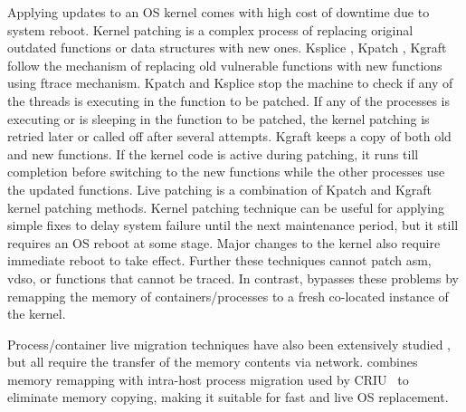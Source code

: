 
Applying updates to an OS kernel comes with high cost of downtime due to system reboot. 
Kernel patching is a complex process of replacing original outdated functions or 
data structures with new ones. Ksplice \cite{arnold2009ksplice}, Kpatch \cite{kpatch1, kpatch2}, 
Kgraft \cite{kgraft} follow the mechanism of replacing old vulnerable functions with 
new functions using ftrace mechanism. Kpatch and Ksplice stop the machine to check 
if any of the threads is executing in the function to be patched. If any of the processes 
is executing or is sleeping in the function to be patched, the kernel patching is retried later 
or called off after several attempts. Kgraft keeps a copy of both old and new functions. 
If the kernel code is active during patching, it runs till completion before switching to 
the new functions while the other processes use the updated functions. 
Live patching \cite{livepatch} is a combination of Kpatch and Kgraft kernel patching 
methods. Kernel patching technique can be useful for applying simple 
fixes to delay system failure until the next maintenance period, 
but it still requires an OS reboot at some stage. 
Major changes to the kernel also require immediate reboot to take effect. 
Further these techniques cannot patch asm, vdso, or functions that cannot be traced.
In contrast, \arch bypasses these problems by remapping the memory of
containers/processes to a fresh co-located instance of the kernel.

Process/container live migration techniques have also been extensively studied 
\cite{spin, exokernel, synthetix, baraks, zayas, douglis, theimer, lsf, condor, criu},
but all require the transfer of the memory contents via network. 
\arch combines memory remapping with intra-host process migration used by CRIU~\cite{criu}
to eliminate memory copying, making it suitable for fast and live OS replacement.

